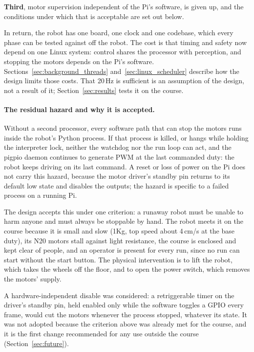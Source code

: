 \textbf{Third}, motor supervision independent of the Pi's software, is given up,
and the conditions under which that is acceptable are set out below.

In return, the robot has one board, one clock and one codebase, which every
phase can be tested against off the robot. The cost is that timing and safety
now depend on one Linux system: control shares the processor with perception,
and stopping the motors depends on the Pi's software.
Sections~\ref{sec:background_threads} and~\ref{sec:linux_scheduler} describe
how the design limits those costs. That 20\,Hz is sufficient is an assumption
of the design, not a result of it; Section~\ref{sec:results} tests it on the
course.

\paragraph{The residual hazard and why it is accepted.}
Without a second processor, every software path that can stop the motors runs
inside the robot's Python process. If that process is killed, or hangs while
holding the interpreter lock, neither the watchdog nor the run loop can act,
and the pigpio daemon continues to generate PWM at the last commanded duty: the
robot keeps driving on its last command. A reset or loss of power on the Pi
does not carry this hazard, because the motor driver's standby pin returns to
its default low state and disables the outputs; the hazard is specific to a
failed process on a running Pi.

The design accepts this under one criterion: a runaway robot must be unable to
harm anyone and must always be stoppable by hand. The robot meets it on the
course because it is small and slow (1Kg, top speed about 4\,cm/s at the base
duty), its N20 motors stall against light resistance, the course is enclosed
and kept clear of people, and an operator is present for every run, since no
run can start without the start button. The physical intervention is to lift
the robot, which takes the wheels off the floor, and to open the power switch,
which removes the motors' supply.

A hardware-independent disable was considered: a retriggerable timer on the
driver's standby pin, held enabled only while the software toggles a GPIO every
frame, would cut the motors whenever the process stopped, whatever its state.
It was not adopted because the criterion above was already met for the course,
and it is the first change recommended for any use outside the course
(Section~\ref{sec:future}).

